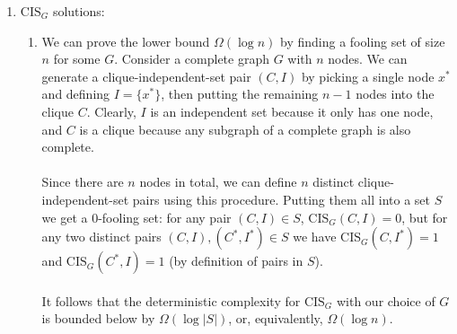 \documentclass{article}
\begin{document}
\begin{enumerate}
\begin{enumerate}[label=(\alph*)]
                \\
        \end{enumerate}

    \item $\textrm{CIS}_G$ solutions:
        \begin{enumerate}[label=(\alph*)]
            \item We can prove the lower bound $\Omega(\log n)$ by finding a
                fooling set of size $n$ for some $G$. Consider a complete graph
                $G$ with $n$ nodes. We can generate a clique-independent-set
                pair $(C, I)$ by picking a single node $x^*$ and defining
                $I = \{ x^* \}$, then putting the remaining $n - 1$ nodes into
                the clique $C$. Clearly, $I$ is an independent set because it
                only has one node, and $C$ is a clique because any subgraph of
                a complete graph is also complete.
                \\\\
                Since there are $n$ nodes in total, we can define $n$ distinct
                clique-independent-set pairs using this procedure. Putting them
                all into a set $S$ we get a 0-fooling set: for any pair $(C, I)
                \in S$, $\textrm{CIS}_G(C, I) = 0$, but for any two distinct
                pairs $(C, I), (C^*, I^*) \in S$ we have $\textrm{CIS}_G(C,
                I^*) = 1$ and $\textrm{CIS}_G(C^*, I) = 1$ (by definition of
                pairs in $S$).
                \\\\
                It follows that the deterministic complexity for
                $\textrm{CIS}_G$ with our choice of $G$ is bounded below by
                $\Omega(\log |S|)$, or, equivalently, $\Omega(\log n)$.
                \\


\end{enumerate}
\end{enumerate}
\end{document}
